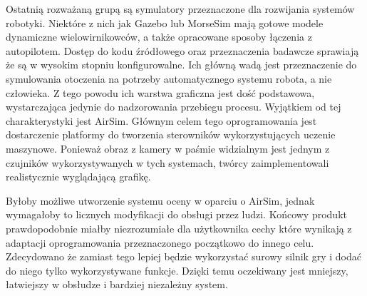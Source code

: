 Ostatnią rozważaną grupą są symulatory przeznaczone dla rozwijania systemów robotyki. Niektóre z nich jak Gazebo\cite{gazebo} lub MorseSim mają gotowe modele dynamiczne wielowirnikowców, a także opracowane sposoby łączenia z autopilotem. Dostęp do kodu źródłowego oraz przeznaczenia badawcze sprawiają że są w wysokim stopniu konfigurowalne. Ich główną wadą jest przeznaczenie do symulowania otoczenia na potrzeby automatycznego systemu robota, a nie człowieka. Z tego powodu ich warstwa graficzna jest dość podstawowa, wystarczająca jedynie do nadzorowania przebiegu procesu. Wyjątkiem od tej charakterystyki jest AirSim\cite{airsim2017}. Głównym celem tego oprogramowania jest dostarczenie platformy do tworzenia sterowników wykorzystujących uczenie maszynowe. Ponieważ obraz z kamery w paśmie widzialnym jest jednym z czujników wykorzystywanych w tych systemach, twórcy zaimplementowali realistycznie wyglądającą grafikę.

Byłoby możliwe utworzenie systemu oceny w oparciu o AirSim, jednak wymagałoby to licznych modyfikacji do obsługi przez ludzi. Końcowy produkt prawdopodobnie miałby niezrozumiałe dla użytkownika cechy które wynikają z adaptacji oprogramowania przeznaczonego początkowo do innego celu. Zdecydowano że zamiast tego lepiej będzie wykorzystać surowy silnik gry i dodać do niego tylko wykorzystywane funkcje. Dzięki temu oczekiwany jest mniejszy, łatwiejszy w obsłudze i bardziej niezależny system.
